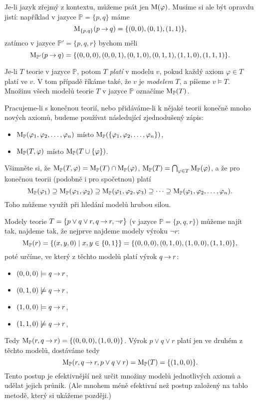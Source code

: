 Je-li jazyk zřejmý z kontextu, můžeme psát jen $\operatorname{M}(\varphi)$. Musíme si ale být opravdu jistí: například v jazyce $\mathbb P=\{p,q\}$ máme 
$$
\operatorname{M}_{\{p,q\}}(p\mathbin{\rightarrow} q)=\{(0,0),(0,1),(1,1)\},$$
zatímco v jazyce $\mathbb P'=\{p,q,r\}$ bychom měli
$$
\operatorname{M}_{\mathbb P'}(p\mathbin{\rightarrow} q)=\{(0,0,0),(0,0,1),(0,1,0),(0,1,1),(1,1,0),(1,1,1)\}.
$$


\begin{definition}\label{definition:validity-of-theory}
    Je-li $T$ teorie v jazyce  $\mathbb P$, potom $T$ \emph{platí} v modelu $v$, pokud každý axiom $\varphi\in T$ platí ve $v$. V tom případě říkáme také, že $v$ je \emph{modelem} $T$, a píšeme $v\models T$. Množinu všech modelů teorie $T$ v jazyce $\mathbb P$ označíme $\operatorname{M}_\mathbb P(T)$.    
\end{definition}

Pracujeme-li s konečnou teorií, nebo přidáváme-li k nějaké teorii konečně mnoho nových axiomů, budeme používat následující zjednodušený zápis:
\begin{itemize}
    \item $\operatorname{M}_\mathbb P(\varphi_1,\varphi_2,\dots,\varphi_n)$ místo $\operatorname{M}_\mathbb P(\{\varphi_1,\varphi_2,\dots,\varphi_n\})$,
    \item $\operatorname{M}_\mathbb P(T,\varphi)$ místo $\operatorname{M}_\mathbb P(T\cup\{\varphi\})$.
\end{itemize}

Všimněte si, že $\operatorname{M}_\mathbb P(T,\varphi)=\operatorname{M}_\mathbb P(T)\cap\operatorname{M}_\mathbb P(\varphi)$, $\operatorname{M}_\mathbb P(T)=\bigcap_{\varphi\in T}\operatorname{M}_\mathbb P(\varphi)$, a že pro konečnou teorii (podobně i pro spočetnou) platí
$$
\operatorname{M}_\mathbb P(\varphi_1)\supseteq \operatorname{M}_\mathbb P(\varphi_1,\varphi_2)\supseteq \operatorname{M}_\mathbb P(\varphi_1,\varphi_2,\varphi_3)\supseteq\dots\supseteq\operatorname{M}_\mathbb P(\varphi_1,\varphi_2,\dots,\varphi_n).
$$
Toho můžeme využít při hledání modelů hrubou silou.

\begin{example}
    Modely teorie $T=\{p\lor q\lor r, q\mathbin{\rightarrow} r, \neg r\}$ (v jazyce $\mathbb P=\{p,q,r\}$) můžeme najít tak, najdeme tak, že nejprve najdeme modely výroku $\neg r$:
    $$
    \operatorname{M}_\mathbb P(r)=\{(x,y,0)\mid x,y\in\{0,1\}\}=\{(0,0,0),(0,1,0),(1,0,0),(1,1,0)\},
    $$
    poté určíme, ve který z těchto modelů platí výrok $q\mathbin{\rightarrow} r$: 
    \begin{itemize}
        \item $(0,0,0)\models q\mathbin{\rightarrow} r$,
        \item $(0,1,0)\not\models q\mathbin{\rightarrow} r$,
        \item $(1,0,0)\models q\mathbin{\rightarrow} r$,
        \item $(1,1,0)\not\models q\mathbin{\rightarrow} r$,
    \end{itemize}  
    Tedy $\operatorname{M}_\mathbb P(r,q\mathbin{\rightarrow} r)=\{(0,0,0),(1,0,0)\}$. Výrok  $p\lor q\lor r$ platí jen ve druhém z těchto modelů, dostáváme tedy
    $$
    \operatorname{M}_\mathbb P(r,q\mathbin{\rightarrow} r,p\lor q\lor r)=\operatorname{M}_\mathbb P(T)=\{(1,0,0)\}.
    $$
    Tento postup je efektivnější než určit množiny modelů jednotlivých axiomů a udělat jejich průnik. (Ale mnohem méně efektivní než postup založený na tablo metodě, který si ukážeme později.)
\end{example}


